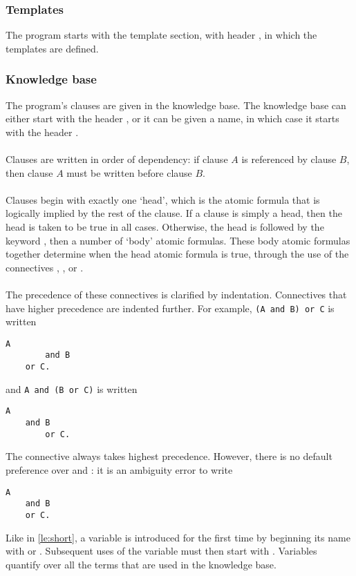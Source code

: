 \documentclass[../main.tex]{subfiles}
\begin{document}
\subsubsection{Templates}
The program starts with the template section, with header , in which the templates are defined. 

\subsubsection{Knowledge base}
\label{section:knowledge-base}
The program's clauses are given in the knowledge base. The knowledge base can either start with the header , or it can be given a name, in which case it starts with the header . 
\\
\\
Clauses are written in order of dependency: if clause $A$ is referenced by clause $B$, then clause $A$ must be written before clause $B$.
\\ 
\\
Clauses begin with exactly one `head', which is the atomic formula that is logically implied by the rest of the clause. If a clause is simply a head, then the head is taken to be true in all cases. Otherwise, the head is followed by the keyword , then a number of `body' atomic formulas. These body atomic formulas together determine when the head atomic formula is true, through the use of the connectives , , or .
\\ 
\\
The precedence of these connectives is clarified by indentation. Connectives that have higher precedence are indented further. For example, \texttt{(A and B) or C} is written
\newpage
\begin{lstlisting}[language={LE}]
    A
        and B
    or C.
\end{lstlisting}
and \texttt{A and (B or C)} is written
\begin{lstlisting}[language={LE}]
    A
    and B
        or C.
\end{lstlisting}
The connective  always takes highest precedence. However, there is no default preference over  and : it is an ambiguity error to write
\begin{lstlisting}[language={LE}]
    A 
    and B
    or C.
\end{lstlisting}
Like in \ref{le:short}, a variable is introduced for the first time by beginning its name with  or .  Subsequent uses of the variable must then start with . Variables quantify over all the terms that are used in the knowledge base.
\end{document}
